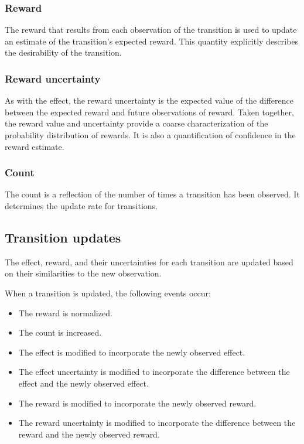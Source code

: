 \subsubsection{Reward}
The reward that results from each observation of the transition is used to update an estimate of the transition's expected reward. This quantity explicitly describes the desirability of the transition.

\subsubsection{Reward uncertainty}
As with the effect, the reward uncertainty is the expected value of the difference between the expected reward and future observations of reward. Taken together, the reward value and uncertainty provide a coarse characterization of the probability distribution of rewards. It is also a quantification of confidence in the reward estimate.

\subsubsection{Count}
The count is a reflection of the number of times a transition has been observed. It determines the update rate for transitions.

\subsection{Transition updates}
The effect, reward, and their uncertainties for each transition are updated based on their similarities to the new observation. 

When a transition is updated, the following events occur:
\begin{itemize}
\item The reward is normalized.
\item The count is increased.
\item The effect is modified to incorporate the newly observed effect.
\item The effect uncertainty is modified to incorporate the difference between the effect and the newly observed effect.
\item The reward is modified to incorporate the newly observed reward.
\item The reward uncertainty is modified to incorporate the difference between the reward and the newly observed reward.
\end{itemize}

